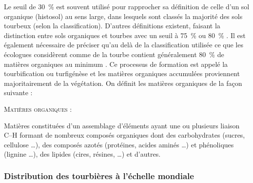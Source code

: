 Le seuil de \SI{30}{\percent} est souvent utilisé pour rapprocher sa définition de celle d'un sol organique (histosol) au sens large, dans lesquels sont classés la majorité des sols tourbeux (selon la classification).
D'autres définitions existent, faisant la distinction entre sols organiques et tourbes avec un seuil à \SI{75}{\percent} \citep{andrejko1983} ou \SI{80}{\percent} \citep{landva1983}.
Il est également nécessaire de préciser qu'au delà de la classification utilisée ce que les écologues considèrent comme de la tourbe contient généralement \SI{80}{\percent} de matières organiques au minimum \citep{rydin2013b}.
Ce processus de formation est appelé la tourbification ou turfigénèse et les matières organiques accumulées proviennent majoritairement de la végétation.
On définit les matières organiques de la façon suivante : 
\begin{pdef}
\textsc{Matières organiques} :

Matières constituées d'un assemblage d'éléments ayant une ou plusieurs liaison C--H formant de nombreux composés organiques dont des carbohydrates (sucres, cellulose \dots), des composés azotés (protéines, acides aminés \dots) et phénoliques (lignine \dots), des lipides (cires, résines, \dots) et d'autres\footnotemark.

\end{pdef}


\subsubsection{Distribution des tourbières à l'échelle mondiale}

